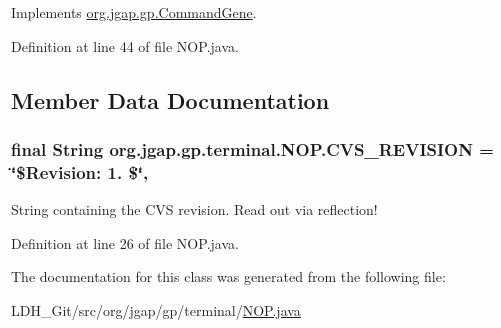 Implements \hyperlink{classorg_1_1jgap_1_1gp_1_1_command_gene_a236141d99059da808afe7a9217e411c7}{org.\-jgap.\-gp.\-Command\-Gene}.



Definition at line 44 of file N\-O\-P.\-java.



\subsection{Member Data Documentation}
\hypertarget{classorg_1_1jgap_1_1gp_1_1terminal_1_1_n_o_p_aa4fae3892097653ceb59bcc2d9fcf1e3}{
\subsubsection[{C\-V\-S\-\_\-\-R\-E\-V\-I\-S\-I\-O\-N}]{\setlength{\rightskip}{0pt plus 5cm}final String org.\-jgap.\-gp.\-terminal.\-N\-O\-P.\-C\-V\-S\-\_\-\-R\-E\-V\-I\-S\-I\-O\-N = \char`\"{}\$Revision\-: 1. \$\char`\"{}\hspace{0.3cm}{\ttfamily [static]}, {\ttfamily [private]}}}\label{classorg_1_1jgap_1_1gp_1_1terminal_1_1_n_o_p_aa4fae3892097653ceb59bcc2d9fcf1e3}
String containing the C\-V\-S revision. Read out via reflection! 

Definition at line 26 of file N\-O\-P.\-java.



The documentation for this class was generated from the following file\-:\begin{DoxyCompactItemize}
\item 
L\-D\-H\-\_\-\-Git/src/org/jgap/gp/terminal/\hyperlink{_n_o_p_8java}{N\-O\-P.\-java}\end{DoxyCompactItemize}
